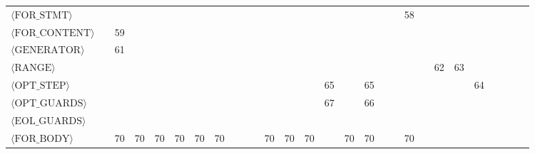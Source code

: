 \begin{center}
\begin{tabular}{l|ccccccccccccccccccccccccccc}
$\langle\text{FOR\_STMT}\rangle$ &  &  &  &  &  &  &  &  &  &  &  &  &  &  &  &  &  &  & 58 &  &  &  &  &  &  &  &  \\
$\langle\text{FOR\_CONTENT}\rangle$ &  & 59 &  &  &  &  &  &  &  &  &  &  &  &  &  &  &  &  &  &  &  &  &  &  &  &  &  \\
$\langle\text{GENERATOR}\rangle$ &  & 61 &  &  &  &  &  &  &  &  &  &  &  &  &  &  &  &  &  &  &  &  &  &  &  &  &  \\
$\langle\text{RANGE}\rangle$ &  &  &  &  &  &  &  &  &  &  &  &  &  &  &  &  &  &  &  &  & 62 & 63 &  &  &  &  &  \\
$\langle\text{OPT\_STEP}\rangle$ &  &  &  &  &  &  &  &  &  &  &  &  &  & 65 &  & 65 &  &  &  &  &  &  & 64 &  &  &  &  \\
$\langle\text{OPT\_GUARDS}\rangle$ &  &  &  &  &  &  &  &  &  &  &  &  &  & 67 &  & 66 &  &  &  &  &  &  &  &  &  &  &  \\
$\langle\text{EOL\_GUARDS}\rangle$ &  &  &  &  &  &  &  &  &  &  &  &  &  &  &  &  &  &  &  &  &  &  &  &  &  &  &  \\
$\langle\text{FOR\_BODY}\rangle$ &  & 70 & 70 & 70 & 70 & 70 & 70 &  &  &  & 70 & 70 & 70 &  & 70 & 70 &  &  & 70 &  &  &  &  &  &  &  &  \\
\bottomrule
\end{tabular}
\label{tab:ll1_part1}
\end{center}

